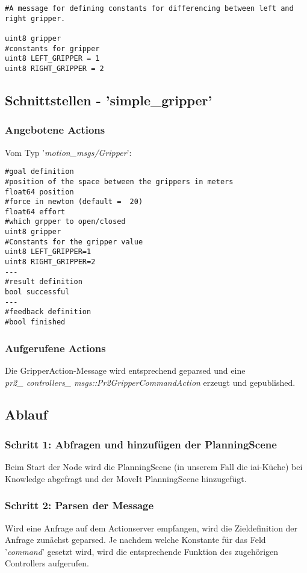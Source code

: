 \documentclass{suturo}
\begin{document}
\begin{lstlisting}[caption={Definition der Gripper.msg},captionpos=b]
#A message for defining constants for differencing between left and right gripper.

uint8 gripper
#constants for gripper
uint8 LEFT_GRIPPER = 1
uint8 RIGHT_GRIPPER = 2
\end{lstlisting}

\subsection{Schnittstellen - 'simple\_gripper'}
\subsubsection{Angebotene Actions}
Vom Typ '\textit{motion\_msgs/Gripper}': \\
\begin{lstlisting}[caption={Definition der GripperAction},captionpos=b]
#goal definition
#position of the space between the grippers in meters
float64 position
#force in newton (default =  20)
float64 effort
#which grpper to open/closed
uint8 gripper
#Constants for the gripper value
uint8 LEFT_GRIPPER=1
uint8 RIGHT_GRIPPER=2
---
#result definition
bool successful
---
#feedback definition
#bool finished
\end{lstlisting}
\subsubsection{Aufgerufene Actions}
Die GripperAction-Message wird entsprechend geparsed und eine \\
 \textit{pr2\_ controllers\_ msgs::Pr2GripperCommandAction} erzeugt und gepublished. \\

\subsection{Ablauf}
\subsubsection{Schritt 1: Abfragen und hinzufügen der PlanningScene}
Beim Start der Node wird die PlanningScene (in unserem Fall die iai-Küche) bei Knowledge abgefragt und der MoveIt PlanningScene hinzugefügt.

\subsubsection{Schritt 2: Parsen der Message}
Wird eine Anfrage auf dem Actionserver empfangen, wird die Zieldefinition der Anfrage zunächst geparsed. Je nachdem welche Konstante für das Feld '\textit{command}' gesetzt wird, wird die entsprechende Funktion des zugehörigen Controllers aufgerufen.
\end{document}
